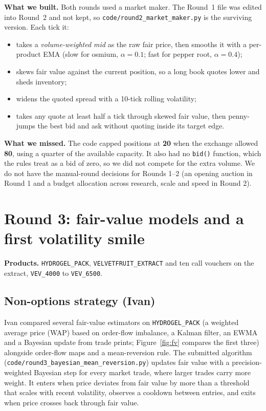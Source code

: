 \documentclass[11pt,a4paper]{article}
\newcommand{\pname}[1]{\texttt{#1}}
\begin{document}
\textbf{What we built.} Both rounds used a market maker. The Round~1 file was edited into Round~2 and
not kept, so \texttt{code/round2\_market\_maker.py} is the surviving version. Each tick it:
\begin{itemize}\setlength\itemsep{0.1em}
\item takes a \emph{volume-weighted mid} as the raw fair price, then smooths it with a per-product EMA
(slow for osmium, $\alpha=0.1$; fast for pepper root, $\alpha=0.4$);
\item skews fair value against the current position, so a long book quotes lower and sheds inventory;
\item widens the quoted spread with a 10-tick rolling volatility;
\item takes any quote at least half a tick through skewed fair value, then penny-jumps the best bid and ask
without quoting inside its target edge.
\end{itemize}

\textbf{What we missed.} The code capped positions at \textbf{20} when the exchange allowed \textbf{80}, using a
quarter of the available capacity. It also had no \texttt{bid()} function, which the rules treat as a bid of
zero, so we did not compete for the extra volume. We do not have the manual-round decisions for Rounds 1--2
(an opening auction in Round 1 and a budget allocation across research, scale and speed in Round 2).

\section{Round 3: fair-value models and a first volatility smile}

\textbf{Products.} \pname{HYDROGEL\_PACK}, \pname{VELVETFRUIT\_EXTRACT} and ten call vouchers on the extract,
\pname{VEV\_4000} to \pname{VEV\_6500}.

\subsection{Non-options strategy (Ivan)}
Ivan compared several fair-value estimators on \pname{HYDROGEL\_PACK} (a weighted average price (WAP) based
on order-flow imbalance, a Kalman filter, an EWMA and a Bayesian update from trade prints; Figure~\ref{fig:fv}
compares the first three) alongside order-flow maps and a mean-reversion rule. The submitted
algorithm (\texttt{code/round3\_bayesian\_mean\_reversion.py}) updates fair value with a precision-weighted
Bayesian step for every market trade, where larger trades carry more weight. It enters when price deviates from
fair value by more than a threshold that scales with recent volatility, observes a cooldown between entries, and
exits when price crosses back through fair value.
\end{document}
